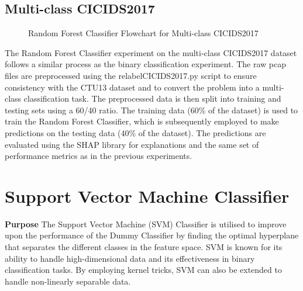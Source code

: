 \subsection{Multi-class CICIDS2017}
\begin{figure}[H]
\centering
{}
\caption{Random Forest Classifier Flowchart for Multi-class CICIDS2017}\label{fig:RandomForestFlowMultiCICIDS2017}
\end{figure}

The Random Forest Classifier experiment on the multi-class CICIDS2017 dataset follows a similar process as the binary classification experiment. The raw pcap files are preprocessed using the relabelCICIDS2017.py script to ensure consistency with the CTU13 dataset and to convert the problem into a multi-class classification task. The preprocessed data is then split into training and testing sets using a 60/40 ratio. The training data (60\% of the dataset) is used to train the Random Forest Classifier, which is subsequently employed to make predictions on the testing data (40\% of the dataset). The predictions are evaluated using the SHAP library for explanations and the same set of performance metrics as in the previous experiments.

\section{Support Vector Machine Classifier}\label{sec:SVMClassifier}
\textbf{Purpose} The Support Vector Machine (SVM) Classifier is utilised to improve upon the performance of the Dummy Classifier by finding the optimal hyperplane that separates the different classes in the feature space. SVM is known for its ability to handle high-dimensional data and its effectiveness in binary classification tasks. By employing kernel tricks, SVM can also be extended to handle non-linearly separable data.

